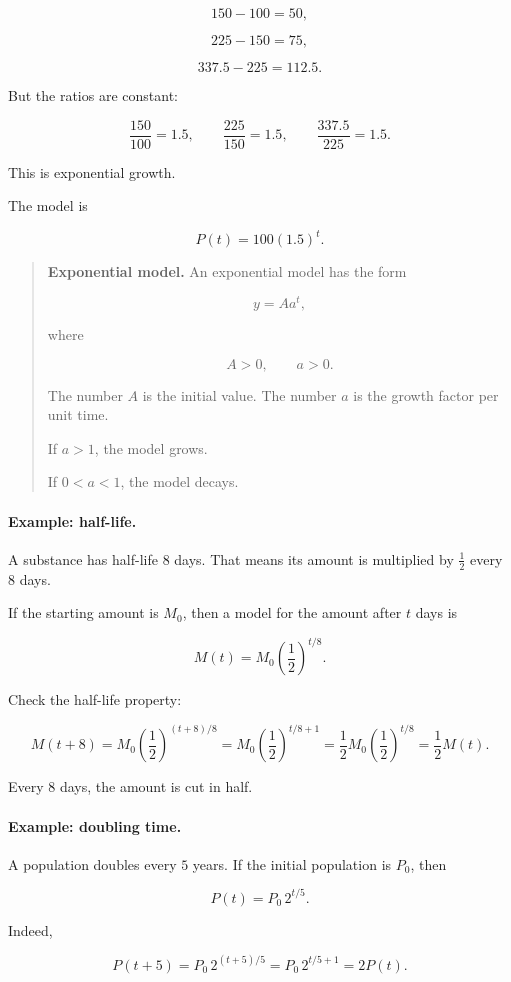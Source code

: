 \[
150-100=50,
\]

\[
225-150=75,
\]

\[
337.5-225=112.5.
\]

But the ratios are constant:

\[
\frac{150}{100}=1.5,
\qquad
\frac{225}{150}=1.5,
\qquad
\frac{337.5}{225}=1.5.
\]

This is exponential growth.

The model is

\[
P(t)=100(1.5)^t.
\]

\begin{quote}
\textbf{Exponential model.}
An exponential model has the form

\[
y=Aa^t,
\]

where

\[
A>0,\qquad a>0.
\]

The number \(A\) is the initial value. The number \(a\) is the growth factor per unit time.

If \(a>1\), the model grows.

If \(0<a<1\), the model decays.
\end{quote}

\paragraph{Example: half-life.}
A substance has half-life \(8\) days. That means its amount is multiplied by \(\frac12\) every \(8\) days.

If the starting amount is \(M_0\), then a model for the amount after \(t\) days is

\[
M(t)=M_0\left(\frac12\right)^{t/8}.
\]

Check the half-life property:

\[
M(t+8)
=
M_0\left(\frac12\right)^{(t+8)/8}
=
M_0\left(\frac12\right)^{t/8+1}
=
\frac12 M_0\left(\frac12\right)^{t/8}
=
\frac12 M(t).
\]

Every \(8\) days, the amount is cut in half.

\paragraph{Example: doubling time.}
A population doubles every \(5\) years. If the initial population is \(P_0\), then

\[
P(t)=P_0\,2^{t/5}.
\]

Indeed,

\[
P(t+5)
=
P_0\,2^{(t+5)/5}
=
P_0\,2^{t/5+1}
=
2P(t).
\]

